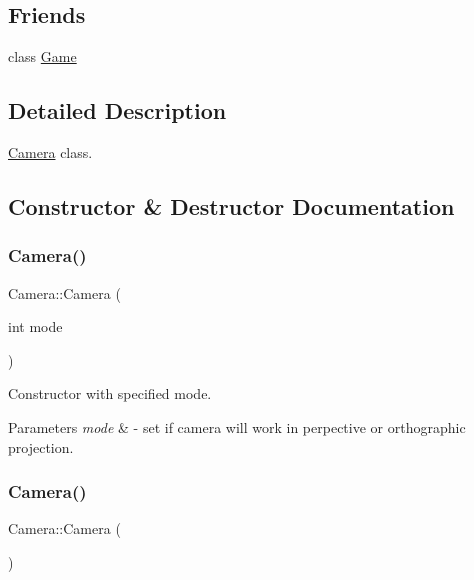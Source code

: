 \subsection*{Friends}
\begin{DoxyCompactItemize}
\item 
class \mbox{\hyperlink{class_camera_aa2fab026580d6f14280c2ffb8063a314}{Game}}
\end{DoxyCompactItemize}


\subsection{Detailed Description}
\mbox{\hyperlink{class_camera}{Camera}} class. 

\subsection{Constructor \& Destructor Documentation}
\mbox{\label{class_camera_a706e41a11eee92cd3f597386ae860885}} 
\subsubsection{\texorpdfstring{Camera()}{Camera()}\hspace{0.1cm}{\footnotesize\ttfamily [1/2]}}
{\footnotesize\ttfamily Camera\+::\+Camera (\begin{DoxyParamCaption}\item[{int}]{mode }\end{DoxyParamCaption})}



Constructor with specified mode. 


\begin{DoxyParams}{Parameters}
{\em mode} & -\/ set if camera will work in perpective or orthographic projection. \\
\hline
\end{DoxyParams}
\mbox{\label{class_camera_a01f94c3543f56ede7af49dc778f19331}} 
\subsubsection{\texorpdfstring{Camera()}{Camera()}\hspace{0.1cm}{\footnotesize\ttfamily [2/2]}}
{\footnotesize\ttfamily Camera\+::\+Camera (\begin{DoxyParamCaption}{ }\end{DoxyParamCaption})}



